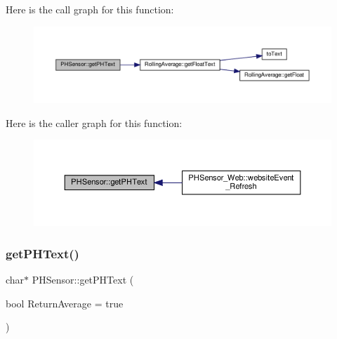 Here is the call graph for this function\+:
\nopagebreak
\begin{figure}[H]
\begin{center}
\leavevmode
\includegraphics[width=350pt]{class_p_h_sensor_afa1a5158732cd57ffb41ae089bf8850f_cgraph}
\end{center}
\end{figure}
Here is the caller graph for this function\+:
\nopagebreak
\begin{figure}[H]
\begin{center}
\leavevmode
\includegraphics[width=350pt]{class_p_h_sensor_afa1a5158732cd57ffb41ae089bf8850f_icgraph}
\end{center}
\end{figure}
\mbox{\label{class_p_h_sensor_a4ea187ef097a55404e3cb3dbd8214cc0}} 
\subsubsection{\texorpdfstring{get\+P\+H\+Text()}{getPHText()}\hspace{0.1cm}{\footnotesize\ttfamily [2/2]}}
{\footnotesize\ttfamily char$\ast$ P\+H\+Sensor\+::get\+P\+H\+Text (\begin{DoxyParamCaption}\item[{bool}]{Return\+Average = {\ttfamily true} }\end{DoxyParamCaption})}

\mbox{\label{class_p_h_sensor_a0cb40466ff35d33b729960b339f608ce}} 
